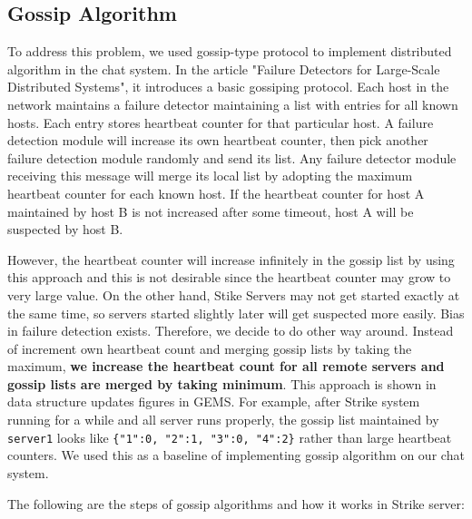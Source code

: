 \documentclass[dareport.tex]{subfiles}
\begin{document}
\subsection{Gossip Algorithm}

To address this problem, we used gossip-type protocol to implement distributed algorithm in the chat system. In the article "Failure Detectors for Large-Scale Distributed Systems"\cite{failuredetector}, it introduces a basic gossiping protocol. Each host in the network maintains a failure detector maintaining a list with entries for all known hosts. Each entry stores heartbeat counter for that particular host. A failure detection module will increase its own heartbeat counter, then pick another failure detection module randomly and send its list. Any failure detector module receiving this message will merge its local list by adopting the maximum heartbeat counter for each known host. If the heartbeat counter for host A  maintained by host B is not increased after some timeout, host A will be suspected by host B. 

However, the heartbeat counter will increase infinitely in the gossip list by using this approach and this is not desirable since the heartbeat counter may grow to very large value. On the other hand, Stike Servers may not get started exactly at the same time, so servers started slightly later will get suspected more easily. Bias in failure detection exists. Therefore, we decide to do other way around. Instead of increment own heartbeat count and merging gossip lists by taking the maximum, \textbf{we increase the heartbeat count for all remote servers and gossip lists are merged by taking minimum}. This approach is shown in data structure updates figures in GEMS\cite{gems}. For example, after Strike system running for a while and all server runs properly, the gossip list maintained by \verb|server1| looks like \verb|{"1":0, "2":1, "3":0, "4":2}| rather than large heartbeat counters. We used this as a baseline of implementing gossip algorithm on our chat system. 

The following are the steps of gossip algorithms and how it works in Strike server:
\end{document}
